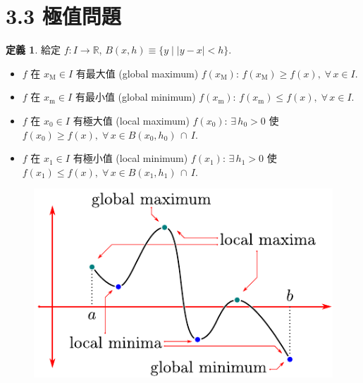 \documentclass[12pt]{extarticle}
\newcommand{\ds}{\displaystyle}
\theoremstyle{definition}
\newtheorem*{dfn}{定義}
\begin{document}
\section*{3.3 極值問題}

\begin{dfn}
  給定 $f:I\to\mathbb{R}$, $\ds B(x, h)\equiv\{y\;|\;|y - x| < h\}$. 
  \begin{itemize}\setlength\itemsep{0em}
    \item $f$ 在 $\ds x_\text{M}\in I$ 有最大值 (global maximum) $\ds f(x_\text{M})$: $\ds f(x_\text{M})\geqslant f(x),\;\forall\,x\in I$. 
    \item $f$ 在 $\ds x_\text{m}\in I$ 有最小值 (global minimum) $\ds f(x_\text{m})$: $\ds f(x_\text{m})\leqslant f(x),\;\forall\,x\in I$. 
    \item $f$ 在 $\ds x_0\in I$ 有極大值 (local maximum) $\ds f(x_0)$: $\ds\exists\,h_0 > 0$ 使 $\ds f(x_0)\geqslant f(x),\;\forall\,x\in B(x_0, h_0)\,\cap\,I$. 
    \item $f$ 在 $\ds x_1\in I$ 有極小值 (local minimum) $\ds f(x_1)$: $\ds\exists\,h_1 > 0$ 使 $\ds f(x_1)\leqslant f(x),\;\forall\,x\in B(x_1, h_1)\,\cap\,I$. 
  \end{itemize}
\end{dfn}

\begin{figure}[!htbp]
  \centering
  \includegraphics[scale=1,page=1]{fig/maxmin3.pdf}
  \hspace{25mm}
\end{figure}
\end{document}
